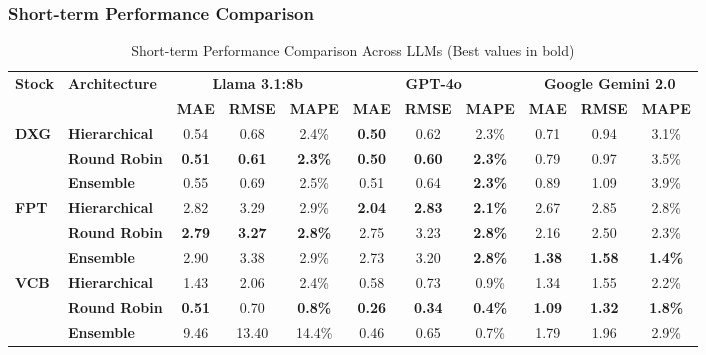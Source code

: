 \subsubsection{Short-term Performance Comparison}

\begin{table}[!h]
\centering
\caption{Short-term Performance Comparison Across LLMs (Best values in bold)}
\label{tab:short_term_comparison}
\setlength{\tabcolsep}{3pt}
\renewcommand{\arraystretch}{1.05}
\scriptsize
\begin{tabular}{llccc|ccc|ccc}
\toprule
\multirow{2}{*}{\textbf{Stock}} &
\multirow{2}{*}{\textbf{Architecture}} & 
\multicolumn{3}{c|}{\textbf{Llama 3.1:8b}} & 
\multicolumn{3}{c|}{\textbf{GPT-4o}} & 
\multicolumn{3}{c}{\textbf{Google Gemini 2.0}} \\
\cmidrule(lr){3-5} \cmidrule(lr){6-8} \cmidrule(lr){9-11}
& & \textbf{MAE} & \textbf{RMSE} & \textbf{MAPE} & \textbf{MAE} & \textbf{RMSE} & \textbf{MAPE} & \textbf{MAE} & \textbf{RMSE} & \textbf{MAPE} \\
\midrule

\multirow{3}{*}{\textbf{DXG}}
& \textbf{Hierarchical} & 0.54 & 0.68 & 2.4\% & \textbf{0.50} & 0.62 & 2.3\% & 0.71 & 0.94 & 3.1\% \\
& \textbf{Round Robin} & \textbf{0.51} & \textbf{0.61} & \textbf{2.3\%} & \textbf{0.50} & \textbf{0.60} & \textbf{2.3\%} & 0.79 & 0.97 & 3.5\% \\
& \textbf{Ensemble} & 0.55 & 0.69 & 2.5\% & 0.51 & 0.64 & \textbf{2.3\%} & 0.89 & 1.09 & 3.9\% \\
\midrule

\multirow{3}{*}{\textbf{FPT}}
& \textbf{Hierarchical} & 2.82 & 3.29 & 2.9\% & \textbf{2.04} & \textbf{2.83} & \textbf{2.1\%} & 2.67 & 2.85 & 2.8\% \\
& \textbf{Round Robin} & \textbf{2.79} & \textbf{3.27} & \textbf{2.8\%} & 2.75 & 3.23 & \textbf{2.8\%} & 2.16 & 2.50 & 2.3\% \\
& \textbf{Ensemble} & 2.90 & 3.38 & 2.9\% & 2.73 & 3.20 & \textbf{2.8\%} & \textbf{1.38} & \textbf{1.58} & \textbf{1.4\%} \\
\midrule

\multirow{3}{*}{\textbf{VCB}}
& \textbf{Hierarchical} & 1.43 & 2.06 & 2.4\% & 0.58 & 0.73 & 0.9\% & 1.34 & 1.55 & 2.2\% \\
& \textbf{Round Robin} & \textbf{0.51} & 0.70 & \textbf{0.8\%} & \textbf{0.26} & \textbf{0.34} & \textbf{0.4\%} & \textbf{1.09} & \textbf{1.32} & \textbf{1.8\%} \\
& \textbf{Ensemble} & 9.46 & 13.40 & 14.4\% & 0.46 & 0.65 & 0.7\% & 1.79 & 1.96 & 2.9\% \\
\midrule


\end{tabular}
\end{table}
